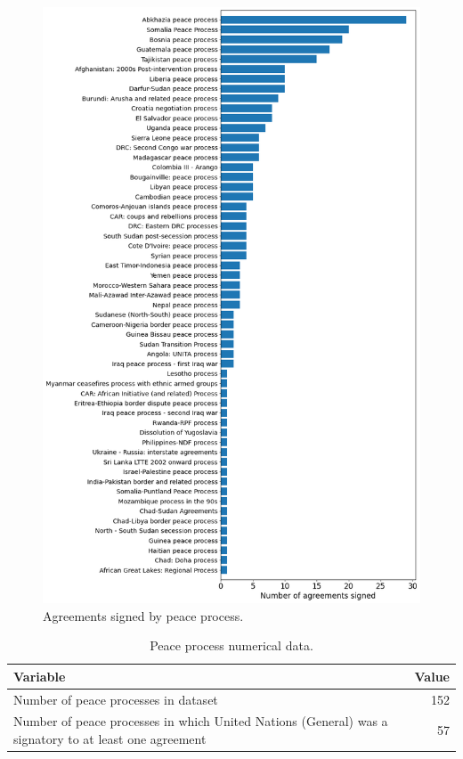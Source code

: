 \documentclass{article}
\begin{document}
\begin{figure}[H]
\begin{center}
\includegraphics[scale=0.36]{./assets/figure_7.png}
\caption{Agreements signed by peace process.}
\end{center}
\end{figure}

\begin{table}[H]
\begin{center}
\small
\begin{tabularx}{\textwidth}{|X|r|}
    \hline
    \textbf{Variable} & \textbf{Value} \\
    \hline
    \hline
     Number of peace processes in dataset & 152 \\
     \hline
     Number of peace processes in which United Nations (General) was a signatory to at least one agreement & 57 \\
     \hline
\end{tabularx}
\end{center}
\normalsize
\caption{Peace process numerical data.}
\end{table}
\end{document}
